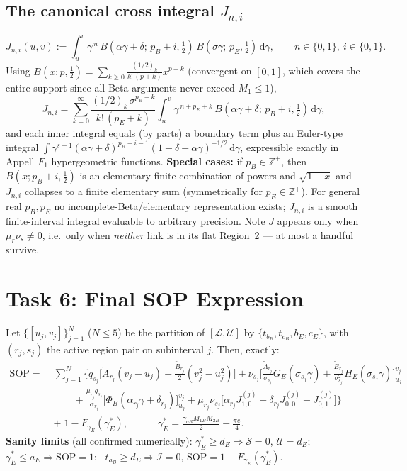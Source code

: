 \documentclass[11pt]{article}
\newcommand{\Binc}[2]{B\!\left(#1;\,#2,\tfrac12\right)}
\newcommand{\dd}{\,\mathrm{d}}
\begin{document}
\subsection{The canonical cross integral $J_{n,i}$}\label{sec:cross}
\begin{equation}
J_{n,i}(u,v):=\int_u^v\gamma^{\,n}\,\Binc{\alpha\gamma+\delta}{p_B{+}i}\,\Binc{\sigma\gamma}{p_E}\dd\gamma,
\qquad n\in\{0,1\},\ i\in\{0,1\}.
\end{equation}
Using $B(x;p,\tfrac12)=\sum_{k\ge0}\frac{(1/2)_k}{k!\,(p+k)}x^{p+k}$ (convergent on $[0,1]$, which covers the entire support since all Beta arguments never exceed $M_1\le 1$),
\begin{equation}
J_{n,i}=\sum_{k=0}^{\infty}\frac{(1/2)_k\,\sigma^{p_E+k}}{k!\,(p_E+k)}
\int_u^v\gamma^{\,n+p_E+k}\,\Binc{\alpha\gamma+\delta}{p_B{+}i}\dd\gamma,
\end{equation}
and each inner integral equals (by parts) a boundary term plus an Euler-type integral
$\int\gamma^{s+1}(\alpha\gamma+\delta)^{p_B+i-1}(1-\delta-\alpha\gamma)^{-1/2}\dd\gamma$,
expressible exactly in Appell $F_1$ hypergeometric functions. \textbf{Special cases:} if $p_B\in\mathbb{Z}^{+}$, then $B(x;p_B{+}i,\tfrac12)$ is an elementary finite combination of powers and $\sqrt{1-x}$ and $J_{n,i}$ collapses to a finite elementary sum (symmetrically for $p_E\in\mathbb{Z}^{+}$). For general real $p_B,p_E$ no incomplete-Beta/elementary representation exists; $J_{n,i}$ is a smooth finite-interval integral evaluable to arbitrary precision. Note $J$ appears only when $\mu_r\nu_s\neq 0$, i.e.\ only when \emph{neither} link is in its flat Region~2 --- at most a handful survive.

\section{Task 6: Final SOP Expression}
Let $\{[u_j,v_j]\}_{j=1}^{N}$ ($N\le 5$) be the partition of $[\mathcal L,\mathcal U]$ by $\{t_{b_B},t_{c_B},b_E,c_E\}$, with $(r_j,s_j)$ the active region pair on subinterval $j$. Then, exactly:
\begin{equation}
\boxed{
\begin{aligned}
\mathrm{SOP}=\;&\sum_{j=1}^{N}\Bigg\{
q_{s_j}\Big[\tilde A_{r_j}(v_j-u_j)+\tfrac{\tilde B_{r_j}}{2}(v_j^2-u_j^2)\Big]
+\nu_{s_j}\Big[\tfrac{\tilde A_{r_j}}{\sigma_{s_j}}G_E(\sigma_{s_j}\gamma)
+\tfrac{\tilde B_{r_j}}{\sigma_{s_j}^2}H_E(\sigma_{s_j}\gamma)\Big]_{u_j}^{v_j}\\
&\qquad+\frac{\mu_{r_j}q_{s_j}}{\alpha_{r_j}}\Big[\Phi_B(\alpha_{r_j}\gamma+\delta_{r_j})\Big]_{u_j}^{v_j}
+\mu_{r_j}\nu_{s_j}\Big[\alpha_{r_j}J_{1,0}^{(j)}+\delta_{r_j}J_{0,0}^{(j)}-J_{0,1}^{(j)}\Big]
\Bigg\}\\
&+\;1-F_{\gamma_E}(\gamma_E^{*}),
\qquad\quad
\gamma_E^{*}=\frac{\gamma_{oB}M_{1B}M_{2B}}{2}-\frac{\pi e}{4}.
\end{aligned}}
\end{equation}
\textbf{Sanity limits} (all confirmed numerically): $\gamma_E^{*}\ge d_E\Rightarrow \mathcal S=0$, $\mathcal U=d_E$; \ $\gamma_E^{*}\le a_E\Rightarrow \mathrm{SOP}=1$; \ $t_{a_B}\ge d_E\Rightarrow \mathcal I=0$, $\mathrm{SOP}=1-F_{\gamma_E}(\gamma_E^{*})$.
\end{document}
